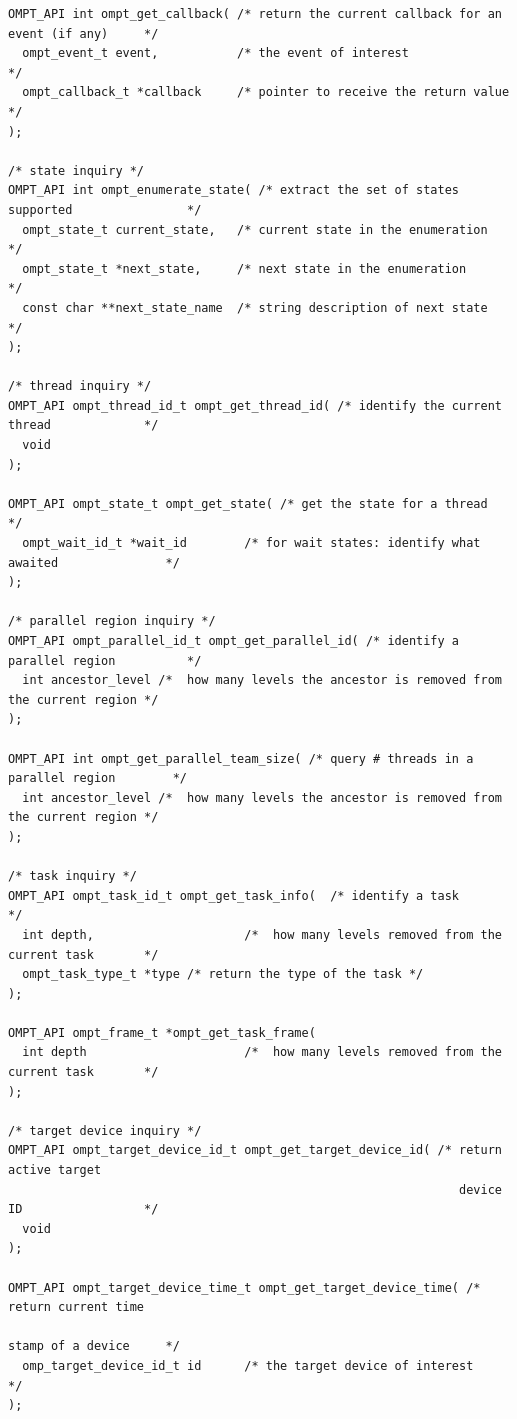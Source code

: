 \documentclass{article}
\begin{document}
{\begin{verbatim}
OMPT_API int ompt_get_callback( /* return the current callback for an event (if any)     */
  ompt_event_t event,           /* the event of interest                                 */
  ompt_callback_t *callback     /* pointer to receive the return value                   */
);

/* state inquiry */
OMPT_API int ompt_enumerate_state( /* extract the set of states supported                */
  ompt_state_t current_state,   /* current state in the enumeration                      */
  ompt_state_t *next_state,     /* next state in the enumeration                         */
  const char **next_state_name  /* string description of next state                      */
);

/* thread inquiry */
OMPT_API ompt_thread_id_t ompt_get_thread_id( /* identify the current thread             */
  void
);

OMPT_API ompt_state_t ompt_get_state( /* get the state for a thread                      */
  ompt_wait_id_t *wait_id        /* for wait states: identify what awaited               */
);

/* parallel region inquiry */
OMPT_API ompt_parallel_id_t ompt_get_parallel_id( /* identify a parallel region          */
  int ancestor_level /*  how many levels the ancestor is removed from the current region */
);

OMPT_API int ompt_get_parallel_team_size( /* query # threads in a parallel region        */
  int ancestor_level /*  how many levels the ancestor is removed from the current region */
);

/* task inquiry */
OMPT_API ompt_task_id_t ompt_get_task_info(  /* identify a task                          */
  int depth,                     /*  how many levels removed from the current task       */
  ompt_task_type_t *type /* return the type of the task */
);

OMPT_API ompt_frame_t *ompt_get_task_frame(
  int depth                      /*  how many levels removed from the current task       */
);

/* target device inquiry */
OMPT_API ompt_target_device_id_t ompt_get_target_device_id( /* return active target
                                                               device ID                 */
  void
);

OMPT_API ompt_target_device_time_t ompt_get_target_device_time( /* return current time
                                                                   stamp of a device     */
  omp_target_device_id_t id      /* the target device of interest                        */
);
\end{verbatim}

}
\end{document}
